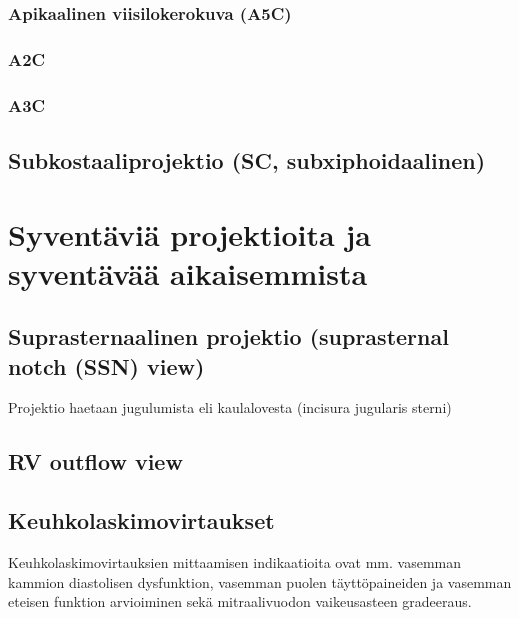 \documentclass[
]{book}
\begin{document}
\subsection{Apikaalinen viisilokerokuva (A5C)}\label{apikaalinen-viisilokerokuva-a5c}

\subsection{A2C}\label{a2c}

\subsection{A3C}\label{a3c}

\section{Subkostaaliprojektio (SC, subxiphoidaalinen)}\label{subkostaaliprojektio-sc-subxiphoidaalinen}

\chapter{Syventäviä projektioita ja syventävää aikaisemmista}\label{syventuxe4viuxe4-projektioita-ja-syventuxe4vuxe4uxe4-aikaisemmista}

\section{Suprasternaalinen projektio (suprasternal notch (SSN) view)}\label{suprasternaalinen-projektio-suprasternal-notch-ssn-view}

Projektio haetaan jugulumista eli kaulalovesta (incisura jugularis sterni)

\section{RV outflow view}\label{rv-outflow-view}

\section{Keuhkolaskimovirtaukset}\label{keuhkolaskimovirtaukset}

Keuhkolaskimovirtauksien mittaamisen indikaatioita ovat mm. vasemman kammion diastolisen dysfunktion, vasemman puolen täyttöpaineiden ja vasemman eteisen funktion arvioiminen sekä mitraalivuodon vaikeusasteen gradeeraus.
\end{document}
